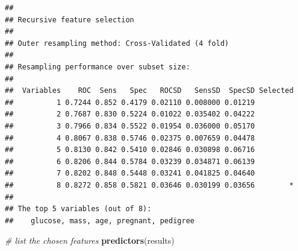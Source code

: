 \documentclass[
]{book}
\newenvironment{Shaded}{\begin{snugshade}}{\end{snugshade}}
\newcommand{\CommentTok}[1]{\textcolor[rgb]{0.56,0.35,0.01}{\textit{#1}}}
\newcommand{\DataTypeTok}[1]{\textcolor[rgb]{0.13,0.29,0.53}{#1}}
\newcommand{\DecValTok}[1]{\textcolor[rgb]{0.00,0.00,0.81}{#1}}
\newcommand{\KeywordTok}[1]{\textcolor[rgb]{0.13,0.29,0.53}{\textbf{#1}}}
\newcommand{\NormalTok}[1]{#1}
\newcommand{\OperatorTok}[1]{\textcolor[rgb]{0.81,0.36,0.00}{\textbf{#1}}}
\newcommand{\StringTok}[1]{\textcolor[rgb]{0.31,0.60,0.02}{#1}}
\begin{document}
\begin{Shaded}
\end{Shaded}

\begin{verbatim}
## 
## Recursive feature selection
## 
## Outer resampling method: Cross-Validated (4 fold) 
## 
## Resampling performance over subset size:
## 
##  Variables    ROC  Sens   Spec   ROCSD   SensSD  SpecSD Selected
##          1 0.7244 0.852 0.4179 0.02110 0.008000 0.01219         
##          2 0.7687 0.830 0.5224 0.01022 0.035402 0.04222         
##          3 0.7966 0.834 0.5522 0.01954 0.036000 0.05170         
##          4 0.8067 0.838 0.5746 0.02375 0.007659 0.04478         
##          5 0.8130 0.842 0.5410 0.02846 0.030898 0.06716         
##          6 0.8206 0.844 0.5784 0.03239 0.034871 0.06139         
##          7 0.8202 0.848 0.5448 0.03241 0.041825 0.04640         
##          8 0.8272 0.858 0.5821 0.03646 0.030199 0.03656        *
## 
## The top 5 variables (out of 8):
##    glucose, mass, age, pregnant, pedigree
\end{verbatim}

\begin{Shaded}
\begin{Highlighting}[]
\CommentTok{# list the chosen features}
\KeywordTok{predictors}\NormalTok{(results)}
\end{Highlighting}
\end{Shaded}
\end{document}
